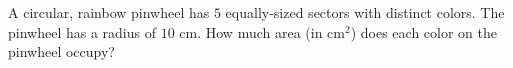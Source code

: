A circular, rainbow pinwheel has $5$ equally-sized sectors with distinct colors. The pinwheel has a radius of $10$ cm. How much area (in $\text{cm}^2$) does each color on the pinwheel occupy?
